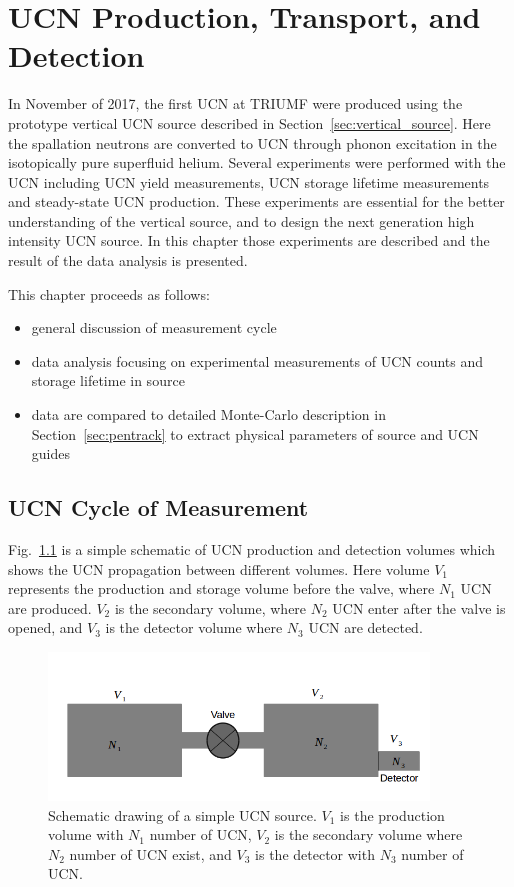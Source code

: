 \chapter{UCN Production, Transport, and
  Detection\label{chap:UCNresult}}

In November of 2017, the first UCN at TRIUMF were produced using the
prototype vertical UCN source described in
Section~\ref{sec:vertical_source}. Here the spallation neutrons are
converted to UCN through phonon excitation in the isotopically pure
superfluid helium. Several experiments were performed with the UCN
including UCN yield measurements, UCN storage lifetime measurements
and steady-state UCN production. These experiments are essential for
the better understanding of the vertical source, and to design the next
generation high intensity UCN source. In this chapter those
experiments are described and the result of the data analysis is
presented.

This chapter proceeds as follows:
\begin{itemize}
\item general discussion of measurement cycle
\item data analysis focusing on experimental measurements of UCN
  counts and storage lifetime in source
\item data are compared to detailed Monte-Carlo description in
  Section~\ref{sec:pentrack} to extract physical parameters of source
  and UCN guides
\end{itemize}

\section{UCN Cycle of Measurement}
Fig.~\ref{fig:volume_schematic} is a simple schematic of UCN
production and detection volumes which shows the UCN propagation
between different volumes. Here volume $V_1$ represents the production
and storage volume before the valve, where $N_1$ UCN are
produced. $V_2$ is the secondary volume, where $N_2$ UCN enter after
the valve is opened, and $V_3$ is the detector volume where $N_3$ UCN
are detected.


\begin{figure}[h]
  \centering
  \includegraphics[width=0.9\textwidth]{volume_schematic.png}
  \caption[Schematic drawing of a simple UCN source]{Schematic drawing
    of a simple UCN source. $V_1$ is the production volume with $N_1$
    number of UCN, $V_2$ is the secondary volume where $N_2$ number of
    UCN exist, and $V_3$ is the detector with $N_3$ number of UCN. }
  \label{fig:volume_schematic}
\end{figure}

